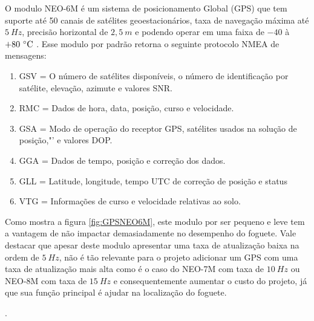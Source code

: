 O modulo NEO-6M é um sistema de posicionamento Global (GPS) que tem suporte até 50 canais de satélites geoestacionários, taxa de navegação máxima até $5 \ Hz$, precisão horizontal de $2,5 \ m$ e podendo operar em uma faixa de $-40$ à $+80 \ \celsius$  \cite{NEO-6M}. Esse modulo por padrão retorna o seguinte protocolo NMEA de mensagens:
 \begin{enumerate}
    \item GSV = O número de satélites disponíveis, o número de identificação por satélite, elevação, azimute e valores SNR.
    \item RMC = Dados de hora, data, posição, curso e velocidade. 
    \item GSA = Modo de operação do receptor GPS, satélites usados na solução de posição,"' e valores DOP.
    \item GGA = Dados de tempo, posição e correção dos dados.
    \item GLL = Latitude, longitude, tempo UTC de correção de posição e status 
    \item VTG = Informações de curso e velocidade relativas ao solo.
 \end{enumerate}



Como mostra a figura \ref{fig:GPSNEO6M}, este modulo por ser pequeno e leve tem a vantagem de não impactar demasiadamente no desempenho do foguete. Vale destacar que apesar deste modulo apresentar uma taxa de atualização baixa na ordem de $5 \ Hz$, não é tão relevante para o projeto adicionar um GPS com uma taxa de atualização mais alta como é o caso do NEO-7M com taxa de $10 \ Hz$ ou NEO-8M com taxa de $15 \ Hz$ e consequentemente aumentar o custo do projeto, já que sua função principal é ajudar na localização do foguete. 


 .

